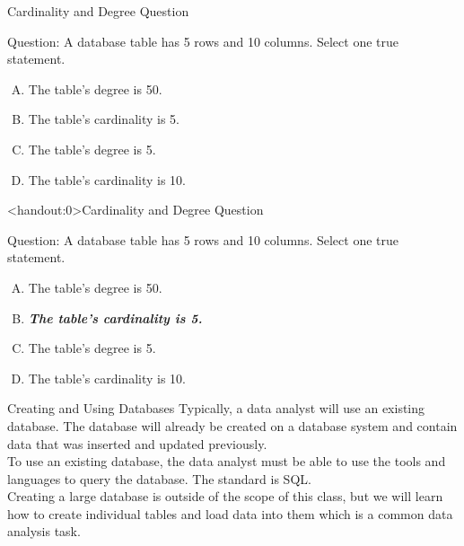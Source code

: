 \documentclass[xcolor=svgnames]{beamer}
\newcommand{\nl}{\\[1em]}
\newcommand{\answer}[1]{\textit{\textbf{\textcolor{iyellow}{#1}}}}
\theoremstyle{example}
\begin{document}
\begin{frame}{Cardinality and Degree Question}
\begin{exampleblock}
{Question: }A database table has 5 rows and 10 columns.  Select one true statement.
\begin{enumerate}[A)]
\item The table's degree is 50.
\item  The table's cardinality is 5.
\item  The table's degree is 5.
\item  The table's cardinality is 10.
\end{enumerate}
\end{exampleblock}
\end{frame}



\begin{frame}<handout:0>{Cardinality and Degree Question}
\begin{block}
{Question: }A database table has 5 rows and 10 columns.  Select one true statement.
\begin{enumerate}[A)]
\item The table's degree is 50.
\item  \answer{The table's cardinality is 5.}
\item  The table's degree is 5.
\item  The table's cardinality is 10.
\end{enumerate}
\end{block}
\end{frame}



\begin{frame}{Creating and Using Databases}
Typically, a data analyst will use an existing database.  The database will already be created on a database system and contain data that was inserted and updated previously.\nl

To use an existing database, the data analyst must be able to use the tools and languages to query the database.  The standard is SQL.\nl

Creating a large database is outside of the scope of this class, but we will learn how to create individual tables and load data into them which is a common data analysis task.

\end{frame}
\end{document}
